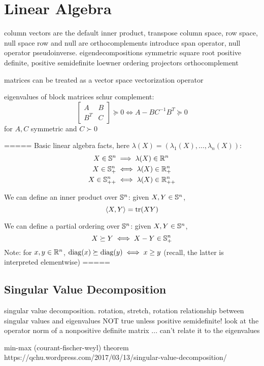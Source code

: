 \chapter{Linear Algebra}
\label{chap:linear_algebra}

column vectors are the default
inner product, transpose
column space, row space, null space
row and null are orthocomplements
introduce span operator, null operator
pseudoinverse. %
eigendecompositions
symmetric square root
positive definite, positive semidefinite
loewner ordering %
projectors
orthocomplement

matrices can be treated as a vector space 
vectorization operator

eigenvalues of block matrices
schur complement:
$$
\begin{bmatrix} A & B \\ B^T & C \end{bmatrix} \succeq 0
\iff A - BC^{-1} B^T \succeq 0
$$
for $A,C$ symmetric and $C \succ 0$

=====
Basic linear algebra facts, here
  $\lambda(X)=(\lambda_1(X),\ldots,\lambda_n(X))$: 
\begin{alignat*}{2}
X \in \mathbb{S}^n &\implies \lambda(X)\in \mathbb{R}^n \\
X \in \mathbb{S}^n_+ &\iff \lambda(X)\in \mathbb{R}^n_+ \\
X \in \mathbb{S}^n_{++} &\iff \lambda(X)\in \mathbb{R}^n_{++}
\end{alignat*}

We can define an inner product over $\mathbb{S}^n$: given $X,Y\in \mathbb{S}^n$,
$$
\langle X, Y \rangle = \operatorname{tr}(XY) 
$$

We can define a partial ordering over $\mathbb{S}^n$: 
  given $X,Y\in \mathbb{S}^n$, 
$$
X\succeq Y \iff X-Y \in \mathbb{S}^n_+
$$
Note: for $x,y \in \mathbb{R}^n$, $\operatorname{diag}(x) \succeq \operatorname{diag}(y) \iff x \geq y$
(recall, the latter is interpreted elementwise)
=====

\section{Singular Value Decomposition}
\label{sec:singular_value_decomposition}

singular value decomposition. rotation, stretch, rotation
relationship between singular values and eigenvalues
NOT true unless positive semidefinite! 
look at the operator norm of a nonpositive definite matrix ... can't relate it to the eigenvalues

min-max (courant-fischer-weyl) theorem
https://qchu.wordpress.com/2017/03/13/singular-value-decomposition/
